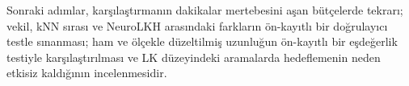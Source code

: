 Sonraki adımlar, karşılaştırmanın dakikalar mertebesini aşan bütçelerde tekrarı; vekil, kNN sırası
ve NeuroLKH arasındaki farkların ön-kayıtlı bir doğrulayıcı testle sınanması; ham ve ölçekle
düzeltilmiş uzunluğun ön-kayıtlı bir eşdeğerlik testiyle karşılaştırılması ve LK düzeyindeki
aramalarda hedeflemenin neden etkisiz kaldığının incelenmesidir.
